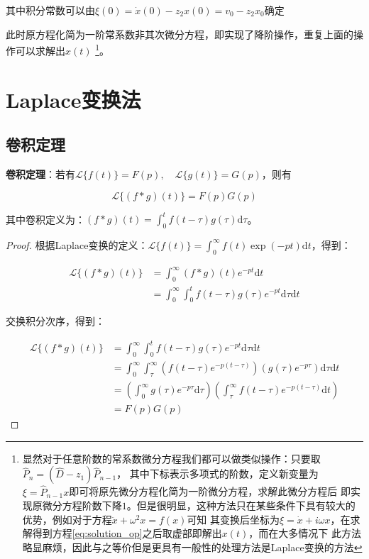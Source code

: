 \documentclass[11pt,a4paper]{ctexart}
\newcommand{\dd}{\mathrm{d}}
\begin{document}
其中积分常数可以由$\xi(0)=\dot{x}(0)-z_2x(0)=v_0-z_2x_0$确定

此时原方程化简为一阶常系数非其次微分方程，即实现了降阶操作，重复上面的操作可以求解出$x(t)$
\footnote{显然对于任意阶数的常系数微分方程我们都可以做类似操作：只要取$\hat{P}_n=(\hat{D}-z_1)\hat{P}_{n-1}$，
其中下标表示多项式的阶数，定义新变量为$\xi=\hat{P}_{n-1}x$即可将原先微分方程化简为一阶微分方程，求解此微分方程后
即实现原微分方程阶数下降$1$。但是很明显，这种方法只在某些条件下具有较大的优势，例如对于方程$\ddot{x}+\omega^2x = f(x)$可知
其变换后坐标为$\xi=\dot{x}+i\omega x$，在求解得到方程\eqref{eq:solution_op}之后取虚部即解出$x(t)$，而在大多情况下
此方法略显麻烦，因此与之等价但是更具有一般性的处理方法是Laplace变换的方法}。

\section{Laplace变换法}

\subsection{卷积定理}

\textbf{卷积定理}：若有$\mathcal{L}\{f(t)\}=F(p),\quad\mathcal{L}\{g(t)\}=G(p)$，则有

\begin{equation}
    \mathcal{L}\{(f\ast g)(t)\}=F(p)G(p)
    \label{eq:laplace_j}
\end{equation}

其中卷积定义为：$(f\ast g)(t)=\int_{0}^{t}f(t-\tau)g(\tau)\dd \tau$。

\begin{proof}
根据Laplace变换的定义：$\mathcal{L}\{f(t)\}=\int_{0}^{\infty}f(t)\exp(-pt)\dd t$，得到：

\begin{align*}
    \mathcal{L}\{(f\ast g)(t)\}&=\int_{0}^{\infty}(f\ast g)(t)e^{-pt}\dd t\\
    &=\int_{0}^{\infty}\int_{0}^{t}f(t-\tau)g(\tau)e^{-pt}\dd \tau\dd t
\end{align*}

交换积分次序，得到：

\begin{align*}
    \mathcal{L}\{(f\ast g)(t)\}&=\int_{0}^{\infty}\int_{0}^{t}f(t-\tau)g(\tau)e^{-pt}\dd \tau\dd t\\
    &=\int_{0}^{\infty}\int_{\tau}^{\infty}\left(f(t-\tau)e^{-p(t-\tau)}\right)\left(g(\tau)e^{-p\tau}\right)\dd \tau\dd t\\
    &=\left(\int_{0}^{\infty}g(\tau)e^{-p\tau}\dd \tau\right)\left(\int_{\tau}^{\infty}f(t-\tau)e^{-p(t-\tau)}\dd t\right)\\
    &=F(p)G(p)
\end{align*}
\end{proof}
\end{document}
